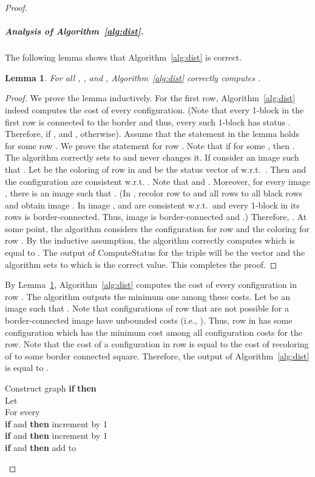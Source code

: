 \documentclass[11pt,english]{article}
\newtheorem{lemma}[theorem]{Lemma}
\numberwithin{figure}{section}
\newcommand{\Compst}{{\sf ComputeStatus}\xspace}
\begin{document}
\begin{proof}
\subparagraph{Analysis of Algorithm~\ref{alg:dist}.}
The following lemma shows that Algorithm~\ref{alg:dist} is correct.
\begin{lemma}
\label{lm:correct}
For all , , and , Algorithm~\ref{alg:dist} correctly computes .
\end{lemma}
\begin{proof} We prove the lemma inductively. For the first row, Algorithm~\ref{alg:dist} indeed computes the cost of every configuration. (Note that every 1-block in the first row is connected to the border and thus, every such 1-block has status . Therefore,  if , and , otherwise). Assume that the statement in the lemma holds for some row . We prove the statement for row . Note that if  for some , then . The algorithm correctly sets  to  and never changes it. If  consider an image  such that . Let  be the coloring of row  in  and  be the status vector of  w.r.t.\ . Then  and the configuration 
are consistent w.r.t. . Note that  and . Moreover, for every image , there is an image  such that . (In , recolor row  to  and all rows  to all black rows and obtain image . In image ,  and  are consistent w.r.t.\  and every 1-block in its rows  is border-connected.  Thus, image  is border-connected and .) Therefore, . At some point, the algorithm considers the configuration  for row  and the coloring  for row . By the inductive assumption, the algorithm correctly computes  which is equal to . The output of \Compst for the triple  will be the vector  and the algorithm sets  to  which is the correct value. This completes the proof.
\end{proof}

By Lemma~\ref{lm:correct}, Algorithm~\ref{alg:dist} computes the cost of every configuration in row . The algorithm outputs the minimum one among these costs. Let  be an image such that . Note that configurations of row  that are not possible for a border-connected image have unbounded costs (i.e., ). Thus, row  in  has some configuration which has the minimum cost among all configuration costs for the row. Note that the cost of a configuration in row  is equal to the cost of recoloring of  to some border connected square. Therefore, the output of Algorithm~\ref{alg:dist} is equal to .

\begin{algorithm}\label{alg:status}
\caption{Subroutine \Compst used in Algorithm~\ref{alg:dist}.}
\DontPrintSemicolon
\BlankLine
\nl Construct graph 
\nl \textbf{if}  \textbf{then} \Return \\
\nl Let \\
\nl For every \\
\nl\quad \textbf{if}  and  \textbf{then} increment  by 1\\
\nl\quad \textbf{if}  and  \textbf{then} increment  by 1\\
\nl\quad \textbf{if}  and  \textbf{then} add  to \\


\end{algorithm}
\end{proof}
\end{document}
